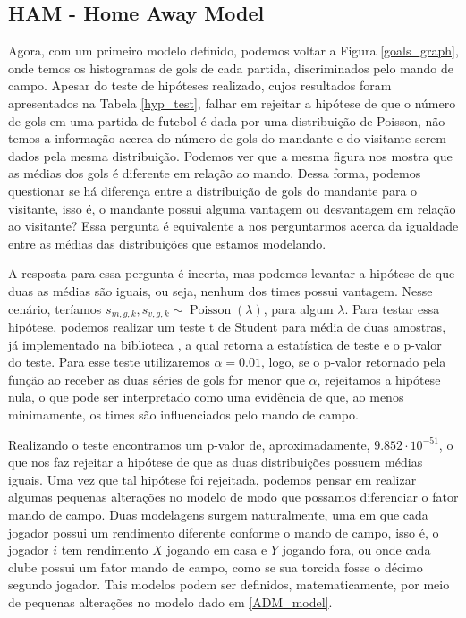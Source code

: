 \subsection{HAM - Home Away Model}

Agora, com um primeiro modelo definido, podemos voltar a Figura \ref{goals_graph}, onde temos os histogramas de gols de cada partida, discriminados pelo mando de campo. Apesar do teste de hipóteses realizado, cujos resultados foram apresentados na Tabela \ref{hyp_test}, falhar em rejeitar a hipótese de que o número de gols em uma partida de futebol é dada por uma distribuição de Poisson, não temos a informação acerca do número de gols do mandante e do visitante serem dados pela mesma distribuição. Podemos ver que a mesma figura nos mostra que as médias dos gols é diferente em relação ao mando. Dessa forma, podemos questionar se há diferença entre a distribuição de gols do mandante para o visitante, isso é, o mandante possui alguma vantagem ou desvantagem em relação ao visitante? Essa pergunta é equivalente a nos perguntarmos acerca da igualdade entre as médias das distribuições que estamos modelando.

A resposta para essa pergunta é incerta, mas podemos levantar a hipótese de que duas as médias são iguais, ou seja, nenhum dos times possui vantagem. Nesse cenário, teríamos $s_{m, g, k}, s_{v, g, k} \sim \operatorname{Poisson}(\lambda)$, para algum $\lambda$. Para testar essa hipótese, podemos realizar um teste t de Student para média de duas amostras, já implementado na biblioteca , a qual retorna a estatística de teste e o p-valor do teste. Para esse teste utilizaremos $\alpha = 0.01$, logo, se o p-valor retornado pela função ao receber as duas séries de gols for menor que $\alpha$, rejeitamos a hipótese nula, o que pode ser interpretado como uma evidência de que, ao menos minimamente, os times são influenciados pelo mando de campo.

Realizando o teste encontramos um p-valor de, aproximadamente, $9.852\cdot 10^{-51}$, o que nos faz rejeitar a hipótese de que as duas distribuições possuem médias iguais. Uma vez que tal hipótese foi rejeitada, podemos pensar em realizar algumas pequenas alterações no modelo de modo que possamos diferenciar o fator mando de campo. Duas modelagens surgem naturalmente, uma em que cada jogador possui um rendimento diferente conforme o mando de campo, isso é, o jogador $i$ tem rendimento $X$ jogando em casa e $Y$ jogando fora, ou onde cada clube possui um fator mando de campo, como se sua torcida fosse o décimo segundo jogador. Tais modelos podem ser definidos, matematicamente, por meio de pequenas alterações no modelo dado em \ref{ADM_model}.


